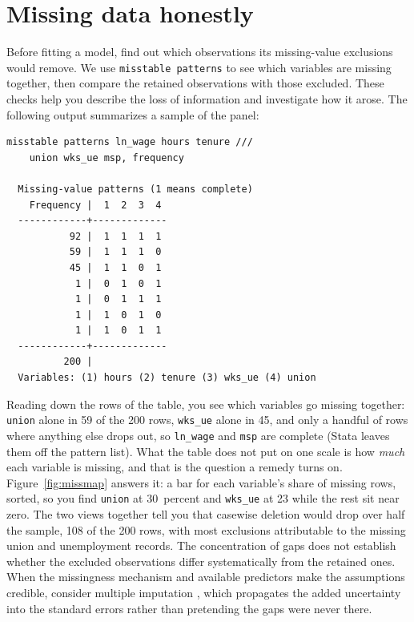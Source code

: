 \documentclass[
    a4paper,
    fontsize=10pt,
    twoside=true,
    numbers=noenddot,
]{kaobook}
\begin{document}
\section{Missing data honestly}
Before fitting a model, find out which observations its missing-value exclusions would remove. We use \texttt{misstable patterns} to see which variables are missing together, then compare the retained observations with those excluded. These checks help you describe the loss of information and investigate how it arose. The following output summarizes a sample of the panel:
\par
{\footnotesize
\begin{verbatim}
misstable patterns ln_wage hours tenure ///
    union wks_ue msp, frequency

  Missing-value patterns (1 means complete)
    Frequency |  1  2  3  4
  ------------+-------------
           92 |  1  1  1  1
           59 |  1  1  1  0
           45 |  1  1  0  1
            1 |  0  1  0  1
            1 |  0  1  1  1
            1 |  1  0  1  0
            1 |  1  0  1  1
  ------------+-------------
          200 |
  Variables: (1) hours (2) tenure (3) wks_ue (4) union
\end{verbatim}
}
Reading down the rows of the table, you see which variables go missing together: \texttt{union} alone in 59 of the 200 rows, \texttt{wks\_ue} alone in 45, and only a handful of rows where anything else drops out, so \texttt{ln\_wage} and \texttt{msp} are complete (Stata leaves them off the pattern list). What the table does not put on one scale is how \emph{much} each variable is missing, and that is the question a remedy turns on. Figure~\ref{fig:missmap} answers it: a bar for each variable's share of missing rows, sorted, so you find \texttt{union} at 30~percent and \texttt{wks\_ue} at 23 while the rest sit near zero. The two views together tell you that casewise deletion would drop over half the sample, 108 of the 200 rows, with most exclusions attributable to the missing union and unemployment records. The concentration of gaps does not establish whether the excluded observations differ systematically from the retained ones. When the missingness mechanism and available predictors make the assumptions credible, consider multiple imputation \parencite{rubin1987imputation}, which propagates the added uncertainty into the standard errors rather than pretending the gaps were never there.
\end{document}
